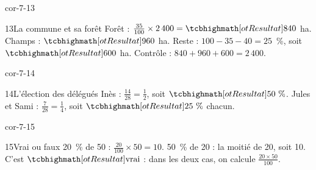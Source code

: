 \begin{blocLivre}{cor-7-13}\begin{corrige}{13}{La commune et sa forêt}
Forêt : $\frac{35}{100}\times2\,400=\res{840}$ ha. Champs : $\res{960}$ ha. Reste : $100-35-40=25$~\%, soit $\res{600}$ ha. Contrôle : $840+960+600=2\,400$.
\end{corrige}\end{blocLivre}
\begin{blocLivre}{cor-7-14}\begin{corrige}{14}{L’élection des délégués}
Inès : $\frac{14}{28}=\frac12$, soit $\res{50\text{~\%}}$. Jules et Sami : $\frac7{28}=\frac14$, soit $\res{25\text{~\%}}$ chacun.
\end{corrige}\end{blocLivre}
\begin{blocLivre}{cor-7-15}\begin{corrige}{15}{Vrai ou faux}
20~\% de 50 : $\frac{20}{100}\times50=10$. 50~\% de 20 : la moitié de 20, soit 10. C’est $\res{\text{vrai}}$ : dans les deux cas, on calcule $\frac{20\times50}{100}$.
\end{corrige}\end{blocLivre}
